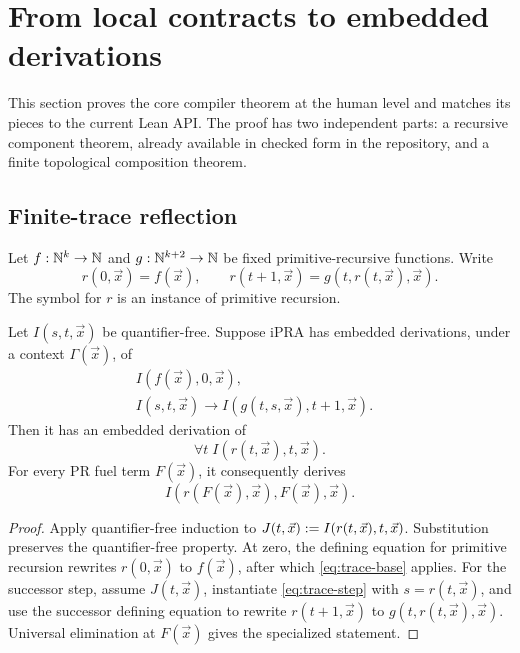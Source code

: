 \section{From local contracts to embedded derivations}
\label{sec:internalization}

This section proves the core compiler theorem at the human level and matches
its pieces to the current Lean API.  The proof has two independent parts: a
recursive component theorem, already available in checked form in the
repository, and a finite topological composition theorem.

\subsection{Finite-trace reflection}

Let \(f:\mathbb{N}^k\to\mathbb{N}\) and \(g:\mathbb{N}^{k+2}\to\mathbb{N}\) be fixed primitive-recursive
functions.  Write
\[
 r(0,\vec x)=f(\vec x),\qquad
 r(t+1,\vec x)=g(t,r(t,\vec x),\vec x).
\]
The symbol for \(r\) is an instance of primitive recursion.

\begin{theorem}
\label{thm:trace-reflection}
Let \(I(s,t,\vec x)\) be quantifier-free.  Suppose iPRA has embedded
derivations, under a context \(\Gamma(\vec x)\), of
\begin{align}
 I(f(\vec x),0,\vec x),&\label{eq:trace-base}\\
 I(s,t,\vec x)\longrightarrow
 I(g(t,s,\vec x),t+1,\vec x).&\label{eq:trace-step}
\end{align}
Then it has an embedded derivation of
\[
 \forall t\;I(r(t,\vec x),t,\vec x).
\]
For every PR fuel term \(F(\vec x)\), it consequently derives
\[
 I(r(F(\vec x),\vec x),F(\vec x),\vec x).
\]
\end{theorem}

\begin{proof}
Apply quantifier-free induction to
\(J(t,\vec x)\mathrel{:=} I(r(t,\vec x),t,\vec x)\).  Substitution preserves the
quantifier-free property.  At zero, the defining equation for primitive
recursion rewrites \(r(0,\vec x)\) to \(f(\vec x)\), after which
\eqref{eq:trace-base} applies.  For the successor step, assume \(J(t,\vec x)\),
instantiate \eqref{eq:trace-step} with \(s=r(t,\vec x)\), and use the successor
defining equation to rewrite
\(r(t+1,\vec x)\) to \(g(t,r(t,\vec x),\vec x)\).  Universal elimination at
\(F(\vec x)\) gives the specialized statement.
\end{proof}

